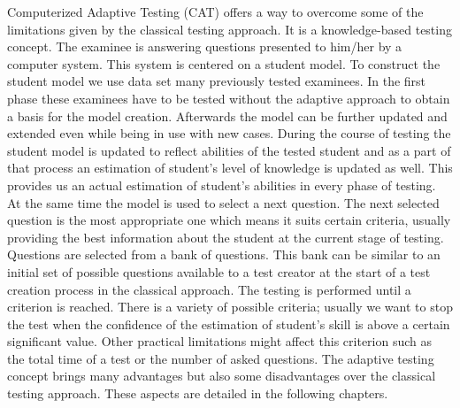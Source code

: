 Computerized Adaptive Testing (CAT) offers a way to overcome some of the limitations given by the classical testing approach. It is a knowledge-based testing concept. The examinee is answering questions presented to him/her by a computer system. This system is centered on a student model. To construct the student model we use data set many previously tested examinees. In the first phase these examinees have to be tested without the adaptive approach to obtain a basis for the model creation. Afterwards the model can be further updated and extended even while being in use with new cases. During the course of testing the student model is updated to reflect abilities of the tested student and as a part of that process an estimation of student’s level of knowledge is updated as well. This provides us an actual estimation of student’s abilities in every phase of testing. At the same time the model is used to select a next question. The next selected question is the most appropriate one which means it suits certain criteria, usually providing the best information about the student at the current stage of testing. Questions are selected from a bank of questions. This bank can be similar to an initial set of possible questions available to a test creator at the start of a test creation process in the classical approach. The testing is performed until a criterion is reached. There is a variety of possible criteria; usually we want to stop the test when the confidence of the estimation of student’s skill is above a certain significant value. Other practical limitations might affect this criterion such as the total time of a test or the number of asked questions. The adaptive testing concept brings many advantages but also some disadvantages over the classical testing approach. These aspects are detailed in the following chapters. 

